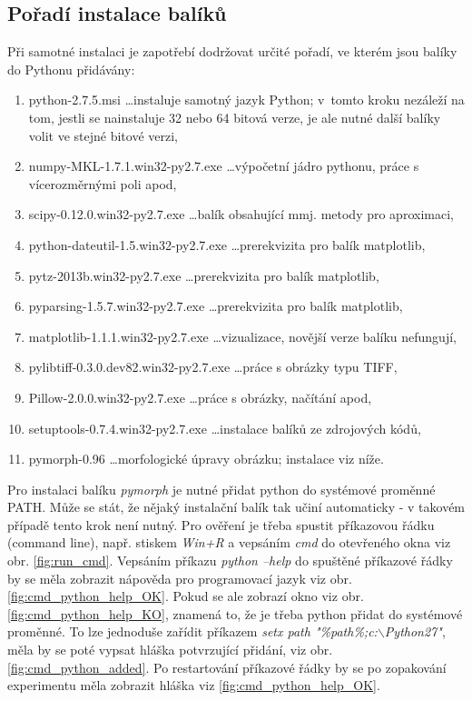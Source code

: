 \subsection{Pořadí instalace balíků}
Při samotné instalaci je zapotřebí dodržovat určité pořadí, ve kterém jsou balíky do Pythonu přidávány:
\begin{enumerate}
	\item python-2.7.5.msi \ldots instaluje samotný jazyk Python; v~tomto kroku nezáleží na tom, jestli se nainstaluje 32 nebo 64 bitová verze, je ale nutné další balíky volit ve stejné bitové verzi,
	\item numpy-MKL-1.7.1.win32-py2.7.exe \ldots výpočetní jádro pythonu, práce s vícerozměrnými poli apod,
	\item scipy-0.12.0.win32-py2.7.exe \ldots balík obsahující mmj. metody pro aproximaci,
	\item python-dateutil-1.5.win32-py2.7.exe \ldots prerekvizita pro balík matplotlib,
	\item pytz-2013b.win32-py2.7.exe \ldots prerekvizita pro balík matplotlib,
	\item pyparsing-1.5.7.win32-py2.7.exe \ldots prerekvizita pro balík matplotlib,
	\item matplotlib-1.1.1.win32-py2.7.exe \ldots vizualizace, novější verze balíku nefungují,
	\item pylibtiff-0.3.0.dev82.win32-py2.7.exe \ldots práce s obrázky typu TIFF,
	\item Pillow-2.0.0.win32-py2.7.exe \ldots práce s obrázky, načítání apod,
	\item setuptools-0.7.4.win32-py2.7.exe \ldots instalace balíků ze zdrojových kódů,
	\item pymorph-0.96 \ldots morfologické úpravy obrázku; instalace viz níže.
\end{enumerate}

Pro instalaci balíku \textit{pymorph} je nutné přidat python do systémové proměnné PATH. Může se stát, že nějaký instalační balík tak učiní automaticky - v takovém případě tento krok není nutný. Pro ověření je třeba spustit příkazovou řádku (command line), např. stiskem \textit{Win+R} a vepsáním \textit{cmd} do otevřeného okna viz obr. \ref{fig:run_cmd}. Vepsáním příkazu \textit{python --help} do spuštěné příkazové řádky by se měla zobrazit nápověda pro programovací jazyk viz obr. \ref{fig:cmd_python_help_OK}. Pokud se ale zobrazí okno viz obr. \ref{fig:cmd_python_help_KO}, znamená to, že je třeba python přidat do systémové proměnné. To lze jednoduše zařídit příkazem \textit{setx path "\%path\%;c:$\backslash$Python27"}, měla by se poté vypsat hláška potvrzující přidání, viz obr. \ref{fig:cmd_python_added}. Po restartování příkazové řádky by se po zopakování experimentu měla zobrazit hláška viz \ref{fig:cmd_python_help_OK}.

